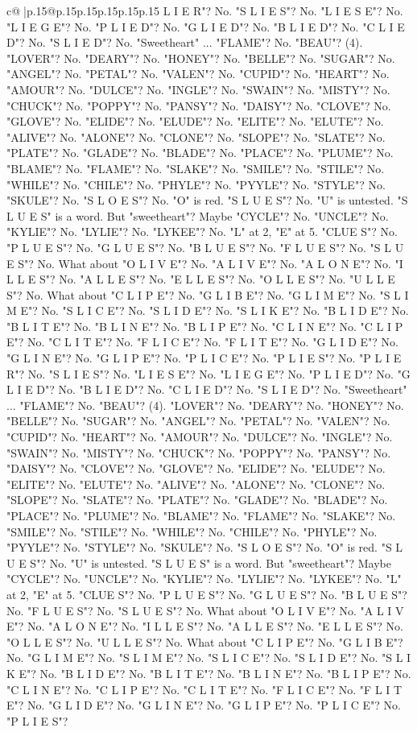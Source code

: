 \documentclass{article}
\begin{document}
{\begin{supertabular}{c@{$\;$}|p{.15\linewidth}@{}p{.15\linewidth}p{.15\linewidth}p{.15\linewidth}p{.15\linewidth}p{.15\linewidth}}
{{{L I E R"? No. "S L I E S"? No. "L I E S E"? No. "L I E G E"? No. "P L I E D"? No. "G L I E D"? No. "B L I E D"? No. "C L I E D"? No. "S L I E D"? No. "Sweetheart" ... "FLAME"? No. "BEAU"? (4). "LOVER"? No. "DEARY"? No. "HONEY"? No. "BELLE"? No. "SUGAR"? No. "ANGEL"? No. "PETAL"? No. "VALEN"? No. "CUPID"? No. "HEART"? No. "AMOUR"? No. "DULCE"? No. "INGLE"? No. "SWAIN"? No. "MISTY"? No. "CHUCK"? No. "POPPY"? No. "PANSY"? No. "DAISY"? No. "CLOVE"? No. "GLOVE"? No. "ELIDE"? No. "ELUDE"? No. "ELITE"? No. "ELUTE"? No. "ALIVE"? No. "ALONE"? No. "CLONE"? No. "SLOPE"? No. "SLATE"? No. "PLATE"? No. "GLADE"? No. "BLADE"? No. "PLACE"? No. "PLUME"? No. "BLAME"? No. "FLAME"? No. "SLAKE"? No. "SMILE"? No. "STILE"? No. "WHILE"? No. "CHILE"? No. "PHYLE"? No. "PYYLE"? No. "STYLE"? No. "SKULE"? No. "S L O E S"? No. "O" is red. "S L U E S"? No. "U" is untested. "S L U E S" is a word. But "sweetheart"? Maybe "CYCLE"? No. "UNCLE"? No. "KYLIE"? No. "LYLIE"? No. "LYKEE"? No. "L" at 2, "E" at 5. "CLUE S"? No. "P L U E S"? No. "G L U E S"? No. "B L U E S"? No. "F L U E S"? No. "S L U E S"? No. What about "O L I V E"? No. "A L I V E"? No. "A L O N E"? No. "I L L E S"? No. "A L L E S"? No. "E L L E S"? No. "O L L E S"? No. "U L L E S"? No. What about "C L I P E"? No. "G L I B E"? No. "G L I M E"? No. "S L I M E"? No. "S L I C E"? No. "S L I D E"? No. "S L I K E"? No. "B L I D E"? No. "B L I T E"? No. "B L I N E"? No. "B L I P E"? No. "C L I N E"? No. "C L I P E"? No. "C L I T E"? No. "F L I C E"? No. "F L I T E"? No. "G L I D E"? No. "G L I N E"? No. "G L I P E"? No. "P L I C E"? No. "P L I E S"? No. "P L I E R"? No. "S L I E S"? No. "L I E S E"? No. "L I E G E"? No. "P L I E D"? No. "G L I E D"? No. "B L I E D"? No. "C L I E D"? No. "S L I E D"? No. "Sweetheart" ... "FLAME"? No. "BEAU"? (4). "LOVER"? No. "DEARY"? No. "HONEY"? No. "BELLE"? No. "SUGAR"? No. "ANGEL"? No. "PETAL"? No. "VALEN"? No. "CUPID"? No. "HEART"? No. "AMOUR"? No. "DULCE"? No. "INGLE"? No. "SWAIN"? No. "MISTY"? No. "CHUCK"? No. "POPPY"? No. "PANSY"? No. "DAISY"? No. "CLOVE"? No. "GLOVE"? No. "ELIDE"? No. "ELUDE"? No. "ELITE"? No. "ELUTE"? No. "ALIVE"? No. "ALONE"? No. "CLONE"? No. "SLOPE"? No. "SLATE"? No. "PLATE"? No. "GLADE"? No. "BLADE"? No. "PLACE"? No. "PLUME"? No. "BLAME"? No. "FLAME"? No. "SLAKE"? No. "SMILE"? No. "STILE"? No. "WHILE"? No. "CHILE"? No. "PHYLE"? No. "PYYLE"? No. "STYLE"? No. "SKULE"? No. "S L O E S"? No. "O" is red. "S L U E S"? No. "U" is untested. "S L U E S" is a word. But "sweetheart"? Maybe "CYCLE"? No. "UNCLE"? No. "KYLIE"? No. "LYLIE"? No. "LYKEE"? No. "L" at 2, "E" at 5. "CLUE S"? No. "P L U E S"? No. "G L U E S"? No. "B L U E S"? No. "F L U E S"? No. "S L U E S"? No. What about "O L I V E"? No. "A L I V E"? No. "A L O N E"? No. "I L L E S"? No. "A L L E S"? No. "E L L E S"? No. "O L L E S"? No. "U L L E S"? No. What about "C L I P E"? No. "G L I B E"? No. "G L I M E"? No. "S L I M E"? No. "S L I C E"? No. "S L I D E"? No. "S L I K E"? No. "B L I D E"? No. "B L I T E"? No. "B L I N E"? No. "B L I P E"? No. "C L I N E"? No. "C L I P E"? No. "C L I T E"? No. "F L I C E"? No. "F L I T E"? No. "G L I D E"? No. "G L I N E"? No. "G L I P E"? No. "P L I C E"? No. "P L I E S"? }}}
\end{supertabular}}
\end{document}

